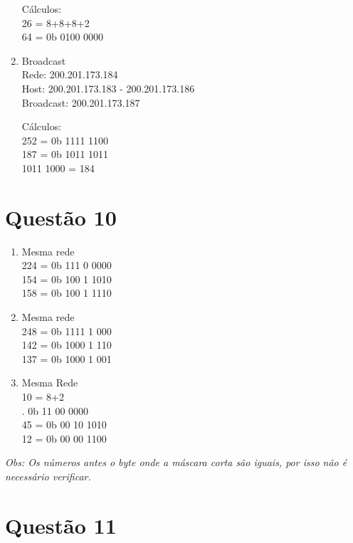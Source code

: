 \documentclass{article}
\begin{document}
\begin{enumerate}
    Cálculos: \\
        26 = 8+8+8+2 \\
        64 = 0b 0100 0000

    \item Broadcast \\
        Rede:  200.201.173.184 \\
        Host:  200.201.173.183 - 200.201.173.186 \\
        Broadcast: 200.201.173.187

    Cálculos: \\
        252 = 0b 1111 1100 \\
        187 = 0b 1011 1011 \\
        1011 1000 = 184
\end{enumerate}

\newpage
\section*{Questão 10}

\begin{enumerate}
    \item Mesma rede \\
        224 = 0b 111 0 0000 \\
        154 = 0b 100 1 1010 \\
        158 = 0b 100 1 1110 \\

    \item Mesma rede \\
        248 = 0b 1111 1 000 \\
        142 = 0b 1000 1 110 \\
        137 = 0b 1000 1 001 \\

    \item Mesma Rede \\
        10 = 8+2 \\ .\hspace{1.75em}
             0b 11 00 0000 \\
        45 = 0b 00 10 1010 \\
        12 = 0b 00 00 1100 \\
\end{enumerate}

 \textit{
Obs: Os números antes o byte onde a máscara corta são iguais, por isso não é
necessário verificar.
}

\newpage
\section*{Questão 11}\
\end{document}
